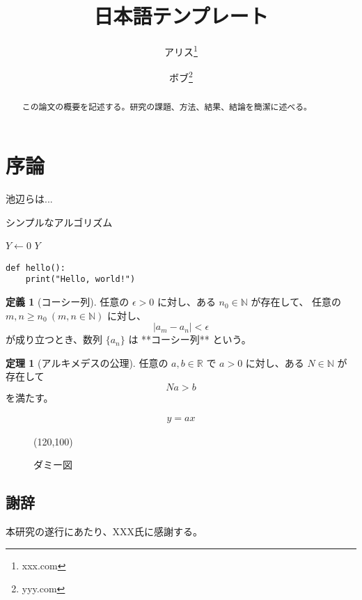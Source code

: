 \documentclass[12pt,dvipdfmx]{jlreq} %
\title{日本語テンプレート}
\author[1]{アリス\thanks{xxx.com}}
\author[1,2]{ボブ\thanks{yyy.com}}
\affil[1]{XXX大学}
\affil[2]{YYY大学}
\date{\empty}
\theoremstyle{definition}
\newtheorem{dfn}{定義}
\newtheorem{thm}{定理}
\begin{document}
\maketitle

\begin{abstract}
この論文の概要を記述する。研究の課題、方法、結果、結論を簡潔に述べる。
\end{abstract}

\section*{序論}
池辺らは...\cite{Ikebe2016-sg}

\begin{algorithm}
\caption{シンプルなアルゴリズム}
$Y \gets 0$\;
\Return $Y$\;
\end{algorithm}


\begin{verbatim}
def hello():
    print("Hello, world!")
\end{verbatim}

\begin{dfn}[コーシー列]
任意の $\epsilon > 0$ に対し、ある $n_0 \in \mathbb{N}$ が存在して、
任意の $m, n \geq n_0 \ (m,n \in \mathbb{N})$ に対し、
\[
\lvert a_m  - a_n  \rvert < \epsilon
\]
が成り立つとき、数列 $\{a_n\}$ は **コーシー列** という。
\end{dfn}	

\begin{thm}[アルキメデスの公理]
任意の $a, b \in \mathbb{R}$ で $a > 0$ に対し、ある $N \in \mathbb{N}$ が存在して
\[
Na > b
\]
を満たす。
\end{thm}

\begin{align}
y=ax
\end{align}

\begin{figure}[htbp]
    \centering
    \framebox(120,100){} 
    \caption{ダミー図}
    \label{fig:dummy}
\end{figure}

\subsection*{謝辞}
本研究の遂行にあたり、XXX氏に感謝する。

\end{document}
